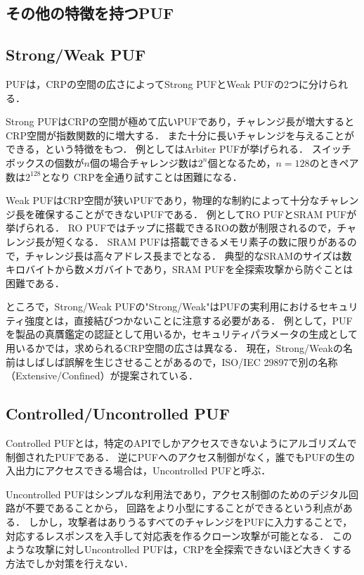 \documentclass[technicalreport]{ieicej} %
\begin{document}
\subsection{その他の特徴を持つPUF}

\subsection{Strong/Weak PUF}
PUFは，CRPの空間の広さによってStrong PUFとWeak PUFの2つに分けられる．

Strong PUFはCRPの空間が極めて広いPUFであり，チャレンジ長が増大するとCRP空間が指数関数的に増大する．
また十分に長いチャレンジを与えることができる，という特徴をもつ．
例としてはArbiter PUFが挙げられる．
スイッチボックスの個数が$n$個の場合チャレンジ数は$2^n$個となるため，$n=128$のときペア数は$2^{128}$となり
CRPを全通り試すことは困難になる．

Weak PUFはCRP空間が狭いPUFであり，物理的な制約によって十分なチャレンジ長を確保することができないPUFである．
例としてRO PUFとSRAM PUFが挙げられる．
RO PUFではチップに搭載できるROの数が制限されるので，チャレンジ長が短くなる．
SRAM PUFは搭載できるメモリ素子の数に限りがあるので，チャレンジ長は高々アドレス長までとなる．
典型的なSRAMのサイズは数キロバイトから数メガバイトであり，SRAM PUFを全探索攻撃から防ぐことは困難である．

ところで，Strong/Weak PUFの"Strong/Weak"はPUFの実利用におけるセキュリティ強度とは，直接結びつかないことに注意する必要がある．
例として，PUFを製品の真贋鑑定の認証として用いるか，セキュリティパラメータの生成として用いるかでは，求められるCRP空間の広さは異なる．
現在，Strong/Weakの名前はしばしば誤解を生じさせることがあるので，ISO/IEC 29897で別の名称（Extensive/Confined）が提案されている\cite{hori-nedo}．

\subsection{Controlled/Uncontrolled PUF}
Controlled PUFとは，特定のAPIでしかアクセスできないようにアルゴリズムで制御されたPUFである\cite{gassend-cpuf1}\cite{gassend-cpuf2}．
逆にPUFへのアクセス制御がなく，誰でもPUFの生の入出力にアクセスできる場合は，Uncontrolled PUFと呼ぶ．

Uncontrolled PUFはシンプルな利用法であり，アクセス制御のためのデジタル回路が不要であることから，
回路をより小型にすることができるという利点がある\cite{sugatake}．
しかし，攻撃者はありうるすべてのチャレンジをPUFに入力することで，対応するレスポンスを入手して対応表を作るクローン攻撃が可能となる．
このような攻撃に対しUncontrolled PUFは，CRPを全探索できないほど大きくする方法でしか対策を行えない．
\end{document}
